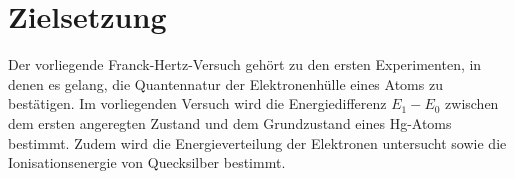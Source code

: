\section{Zielsetzung}
\label{sec:Zielsetzung}
Der vorliegende Franck-Hertz-Versuch gehört zu den ersten Experimenten, in denen es gelang, die Quantennatur der Elektronenhülle eines Atoms zu bestätigen.
Im vorliegenden Versuch wird die Energiedifferenz $E_1-E_0$ zwischen dem ersten angeregten Zustand und dem Grundzustand eines Hg-Atoms bestimmt.
Zudem wird die Energieverteilung der Elektronen untersucht sowie die Ionisationsenergie von Quecksilber bestimmt.
